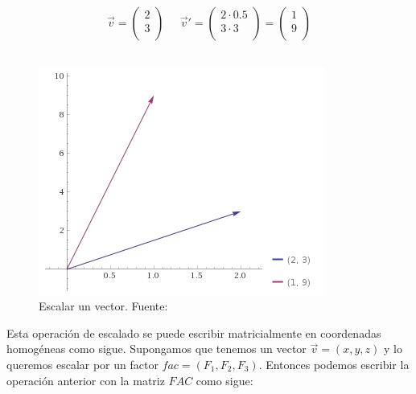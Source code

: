 \begin{equation}
	\label{eq:scaling}
	\overrightarrow{v} = 
	\left( \begin{array}{c}
			2 \\
			3 \\
	\end{array} \right)
	\;\;\;\;\;
	\overrightarrow{v}' =
	\left( \begin{array}{c}
		2\cdot0.5 \\
		3\cdot3 \\
	\end{array}	\right) =  
	\left( \begin{array}{c}
			1 \\
			9 \\
	\end{array} \right)
\end{equation}\\

\begin{figure}[ht]
	\centering
	\includegraphics{figures/scaling.png}
	\caption[Escalar un vector.]{Escalar un vector. Fuente:~\cite{wolfram}}
	\label{fig:scaling}
\end{figure}

Esta operación de escalado se puede escribir matricialmente en coordenadas
homogéneas como sigue.  Supongamos que tenemos un vector
$\overrightarrow{v}=(x,y,z)$ y lo queremos escalar por un factor
$fac=(F_1,F_2,F_3)$. Entonces podemos escribir la operación anterior con la
matriz $FAC$ como sigue:


